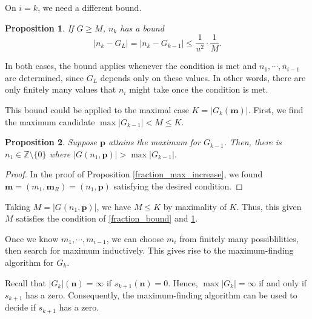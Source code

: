 \documentclass{article}
\theoremstyle{definition}
\theoremstyle{plain}
\newtheorem{proposition}{Proposition}[section]
\theoremstyle{remark}
\numberwithin{equation}{section}
\newcommand{\bZ}{\mathbb{Z}}
\newcommand{\abs}[1]{\left\lvert{#1}\right\rvert}
\begin{document}
On $i = k$, we need a different bound.

\begin{proposition}\label{fraction_bound_last}
  If $G \geq M$, $n_k$ has a bound
  \[ \abs{n_k - G_L} = \abs{n_k - G_{k-1}} \leq \frac{1}{u^2} \cdot \frac{1}{M}. \]
\end{proposition}

In both cases, the bound applies whenever the condition is met and $n_1, \cdots, n_{i-1}$ are determined,
since $G_L$ depends only on these values.
In other words, there are only finitely many values that $n_i$ might take once the condition is met.

This bound could be applied to the maximal case $K = \abs{G_k(\mathbf{m})}$.
First, we find the maximum candidate $\max \abs{G_{k-1}} < M \leq K$.

\begin{proposition}
  Suppose $\mathbf{p}$ attains the maximum for $G_{k-1}$.
  Then, there is $n_1 \in \bZ \setminus \{ 0 \}$ where $\abs{G(n_1, \mathbf{p})} > \max \abs{G_{k-1}}$.
\end{proposition}
\begin{proof}
  In the proof of Proposition \ref{fraction_max_increase},
  we found $\mathbf{m} = (m_1, \mathbf{m}_R) = (n_1, \mathbf{p})$
  satisfying the desired condition.
\end{proof}

Taking $M = \abs{G(n_1, \mathbf{p})}$, we have $M \leq K$ by maximality of $K$.
Thus, this given $M$ satisfies the condition of \ref{fraction_bound} and \ref{fraction_bound_last}.

Once we know $m_1, \cdots, m_{i-1}$,
we can choose $m_i$ from finitely many possiblilities, then search for maximum inductively.
This gives rise to the maximum-finding algorithm for $G_k$.

Recall that $\abs{G_k}(\mathbf{n}) = \infty$ if $s_{k+1}(\mathbf{n}) = 0$.
Hence, $\max \abs{G_k} = \infty$ if and only if $s_{k+1}$ has a zero.
Consequently, the maximum-finding algorithm can be used to decide if $s_{k+1}$ has a zero.
\end{document}
